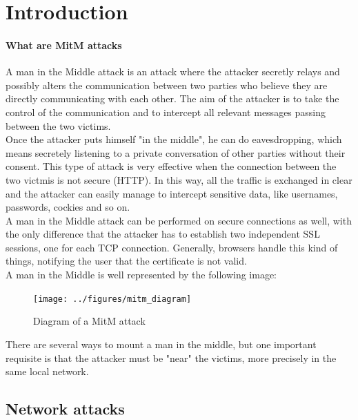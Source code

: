 \documentclass{article}
\begin{document}
\def\snode#1#2#3{%
  \node[long,right=of #1, label=center:#3] (#2) {}}

\def\dnode#1#2#3{%
  \node[double,right=of #1, label=center:#3] (#2) {}}



\section{Introduction}
\paragraph{What are \ac{MitM} attacks}
A man in the Middle attack is an attack where the attacker secretly relays and possibly alters the communication between two parties who believe they are directly communicating with each other. The aim of the attacker is to take the control of the communication and to intercept all relevant messages passing between the two victims. \\
Once the attacker puts himself "in the middle", he can do eavesdropping, which means secretely listening to a private conversation of other parties without their consent.
This type of attack is very effective when the connection between the two victmis is not secure (HTTP). In this way, all the traffic is exchanged in clear and the attacker can easily manage to intercept sensitive data, like usernames, passwords, cockies and so on. \\
A man in the Middle attack can be performed on secure connections as well, with the only difference that the attacker has to establish two independent SSL sessions, one for each TCP connection. Generally, browsers handle this kind of things, notifying the user that the certificate is not valid. \\
A man in the Middle is well represented by the following image:

\begin{figure}[h]
\center
\texttt{[image: ../figures/mitm\_diagram]}
\caption{Diagram of a MitM attack}
\end{figure}

There are several ways to mount a man in the middle, but one important requisite is that the attacker must be "near" the victims, more precisely in the same local network. 

\subsection{Network attacks}
\end{document}
